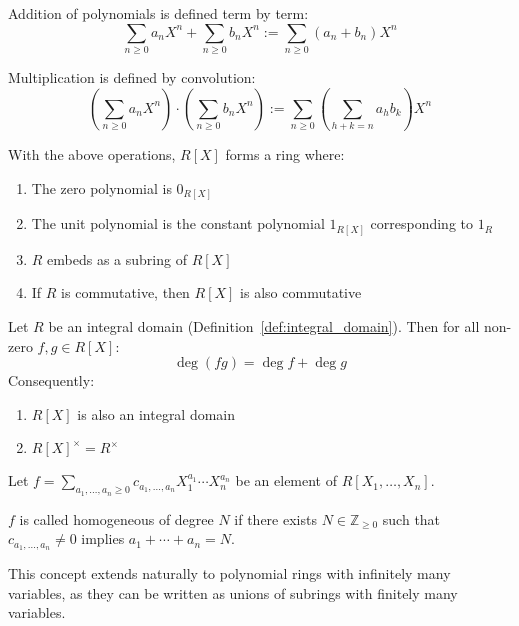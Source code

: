 \begin{definition}
  Addition of polynomials is defined term by term:
  \[
    \sum_{n \geq 0} a_nX^n + \sum_{n \geq 0} b_nX^n := \sum_{n \geq 0} (a_n + b_n)X^n
  \]

  Multiplication is defined by convolution:
  \[
    \left(\sum_{n \geq 0} a_nX^n\right) \cdot \left(\sum_{n \geq 0} b_nX^n\right) := \sum_{n \geq 0} \left(\sum_{h+k=n} a_hb_k\right)X^n
  \]
\end{definition}

\begin{proposition}
  With the above operations, $R[X]$ forms a ring where:
  \begin{enumerate}
    \item The zero polynomial is $0_{R[X]}$
    \item The unit polynomial is the constant polynomial $1_{R[X]}$ corresponding to $1_R$
    \item $R$ embeds as a subring of $R[X]$
    \item If $R$ is commutative, then $R[X]$ is also commutative
  \end{enumerate}
\end{proposition}

\begin{lemma}
  Let $R$ be an integral domain (Definition~\ref{def:integral_domain}). Then for all non-zero $f,g \in R[X]$:
  \[
    \deg(fg) = \deg f + \deg g
  \]
  Consequently:
  \begin{enumerate}
    \item $R[X]$ is also an integral domain
    \item $R[X]^\times = R^\times$
  \end{enumerate}
\end{lemma}

\begin{definition}
  Let $f = \sum_{a_1,\ldots,a_n \geq 0} c_{a_1,\ldots,a_n} X_1^{a_1}\cdots X_n^{a_n}$ be an element of $R[X_1,\ldots,X_n]$.

  $f$ is called homogeneous of degree $N$ if there exists $N \in \mathbb{Z}_{\geq 0}$ such that $c_{a_1,\ldots,a_n} \neq 0$ implies $a_1 + \cdots + a_n = N$.
\end{definition}

\begin{remark}
  This concept extends naturally to polynomial rings with infinitely many variables, as they can be written as unions of subrings with finitely many variables.
\end{remark}

